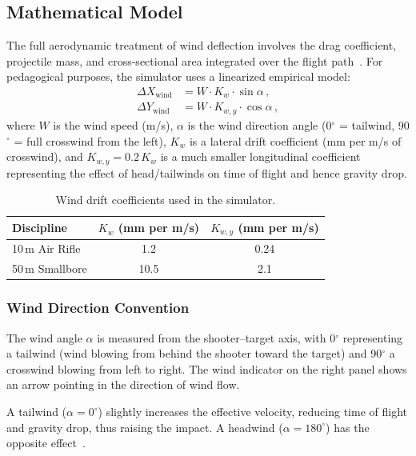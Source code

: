 \documentclass[11pt]{article}
\begin{document}
\subsection{Mathematical Model}
The full aerodynamic treatment of wind deflection involves the drag
coefficient, projectile mass, and cross-sectional area integrated
over the flight path~\cite{mccoy}.  For pedagogical purposes, the
simulator uses a linearized empirical model:
\begin{align}
  \Delta X_{\text{wind}} &= W \cdot K_w \cdot \sin\alpha \,,
    \label{eq:wind-x}\\
  \Delta Y_{\text{wind}} &= W \cdot K_{w,y} \cdot \cos\alpha \,,
    \label{eq:wind-y}
\end{align}
where $W$ is the wind speed (m/s), $\alpha$ is the wind direction
angle (0$^\circ$ = tailwind, 90$^\circ$ = full crosswind from the
left), $K_w$ is a lateral drift coefficient (mm per m/s of
crosswind), and $K_{w,y} = 0.2\,K_w$ is a much smaller longitudinal
coefficient representing the effect of head/tailwinds on time of
flight and hence gravity drop.

\begin{table}[H]
\centering\small
\begin{tabular}{@{}lcc@{}}
\toprule
\textbf{Discipline} & $K_w$ (mm per m/s) & $K_{w,y}$ (mm per m/s) \\
\midrule
10\,m Air Rifle  & 1.2  & 0.24 \\
50\,m Smallbore  & 10.5 & 2.1  \\
\bottomrule
\end{tabular}
\caption{Wind drift coefficients used in the simulator.}
\label{tab:wind}
\end{table}

\subsubsection*{Wind Direction Convention}
The wind angle $\alpha$ is measured from the shooter--target axis,
with 0$^\circ$ representing a tailwind (wind blowing from behind the
shooter toward the target) and 90$^\circ$ a crosswind blowing from
left to right.  The wind indicator on the right panel shows an arrow
pointing in the direction of wind flow.

A tailwind ($\alpha = 0^\circ$) slightly increases the effective
velocity, reducing time of flight and gravity drop, thus raising the
impact.  A headwind ($\alpha = 180^\circ$) has the opposite
effect~\cite{litz}.
\end{document}

